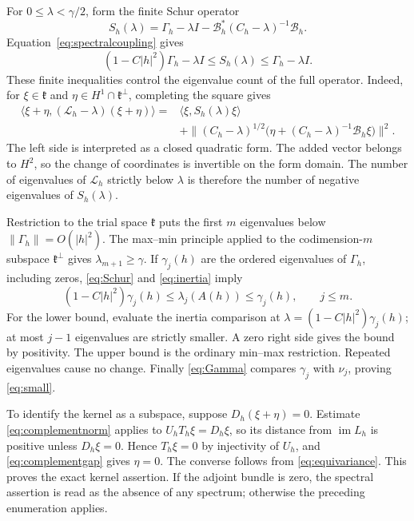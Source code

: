 \documentclass[11pt]{amsart}
\theoremstyle{definition}
\theoremstyle{remark}
\newcommand{\kk}{\mathfrak k}
\newcommand{\im}{\operatorname{im}}
\newcommand{\ip}[2]{\langle #1,#2\rangle}
\newcommand{\norm}[1]{\lVert #1\rVert}
\begin{document}
For $0\leq\lambda<\gamma/2$, form the finite Schur operator
\[
 S_h(\lambda)=\Gamma_h-\lambda I
       -\mathcal B_h^*(C_h-\lambda)^{-1}\mathcal B_h.
\]
Equation~\eqref{eq:spectralcoupling} gives
\begin{equation}\label{eq:Schur}
 (1-C|h|^2)\Gamma_h-\lambda I
 \leq S_h(\lambda)\leq\Gamma_h-\lambda I.
\end{equation}
These finite inequalities control the eigenvalue count of the full
operator. Indeed, for $\xi\in\kk$ and
$\eta\in H^1\cap\kk^\perp$, completing the square gives
\begin{equation}\label{eq:inertia}
 \begin{split}
 \ip{\xi+\eta}{(\mathcal L_h-\lambda)(\xi+\eta)}
 ={}&\ip{\xi}{S_h(\lambda)\xi}\\
 &+\norm{(C_h-\lambda)^{1/2}
   \bigl(\eta+(C_h-\lambda)^{-1}\mathcal B_h\xi\bigr)}^2.
 \end{split}
\end{equation}
The left side is interpreted as a closed quadratic form.
The added vector belongs to $H^2$, so the change of coordinates is
invertible on the form domain. The number of eigenvalues of
$\mathcal L_h$ strictly below $\lambda$ is therefore the number
of negative eigenvalues of $S_h(\lambda)$.

Restriction to the trial space $\kk$ puts the first $m$ eigenvalues
below $\norm{\Gamma_h}=O(|h|^2)$. The max--min principle applied
to the codimension-$m$ subspace $\kk^\perp$ gives
$\lambda_{m+1}\geq\gamma$. If $\gamma_j(h)$ are the ordered
eigenvalues of $\Gamma_h$, including zeros, \eqref{eq:Schur} and
\eqref{eq:inertia} imply
\[
 (1-C|h|^2)\gamma_j(h)
 \leq\lambda_j(A(h))\leq\gamma_j(h),\qquad j\leq m.
\]
For the lower bound, evaluate the inertia comparison at
$\lambda=(1-C|h|^2)\gamma_j(h)$; at most $j-1$ eigenvalues are
strictly smaller. A zero right side gives the bound by positivity.
The upper bound is the ordinary min--max restriction. Repeated
eigenvalues cause no change. Finally \eqref{eq:Gamma} compares
$\gamma_j$ with $\nu_j$, proving \eqref{eq:small}.

To identify the kernel as a subspace, suppose
$D_h(\xi+\eta)=0$. Estimate \eqref{eq:complementnorm} applies to
$U_hT_h\xi=D_h\xi$, so its distance from $\im L_h$ is positive
unless $D_h\xi=0$. Hence $T_h\xi=0$ by injectivity of $U_h$,
and \eqref{eq:complementgap} gives $\eta=0$. The converse follows
from \eqref{eq:equivariance}. This proves the exact kernel assertion.
If the adjoint bundle is zero, the spectral assertion is read as the
absence of any spectrum; otherwise the preceding enumeration applies.
\end{document}
